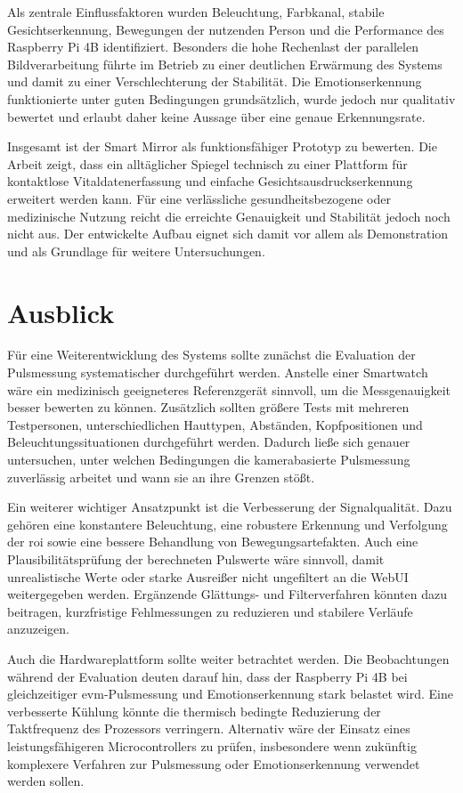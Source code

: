 Als zentrale Einflussfaktoren wurden Beleuchtung, Farbkanal, stabile Gesichtserkennung, Bewegungen der nutzenden Person und die Performance des Raspberry Pi 4B identifiziert. Besonders die hohe Rechenlast der parallelen Bildverarbeitung führte im Betrieb zu einer deutlichen Erwärmung des Systems und damit zu einer Verschlechterung der Stabilität. Die Emotionserkennung funktionierte unter guten Bedingungen grundsätzlich, wurde jedoch nur qualitativ bewertet und erlaubt daher keine Aussage über eine genaue Erkennungsrate.

Insgesamt ist der Smart Mirror als funktionsfähiger Prototyp zu bewerten. Die Arbeit zeigt, dass ein alltäglicher Spiegel technisch zu einer Plattform für kontaktlose Vitaldatenerfassung und einfache Gesichtsausdruckserkennung erweitert werden kann. Für eine verlässliche gesundheitsbezogene oder medizinische Nutzung reicht die erreichte Genauigkeit und Stabilität jedoch noch nicht aus. Der entwickelte Aufbau eignet sich damit vor allem als Demonstration und als Grundlage für weitere Untersuchungen.

\section{Ausblick}

Für eine Weiterentwicklung des Systems sollte zunächst die Evaluation der Pulsmessung systematischer durchgeführt werden. Anstelle einer Smartwatch wäre ein medizinisch geeigneteres Referenzgerät sinnvoll, um die Messgenauigkeit besser bewerten zu können. Zusätzlich sollten größere Tests mit mehreren Testpersonen, unterschiedlichen Hauttypen, Abständen, Kopfpositionen und Beleuchtungssituationen durchgeführt werden. Dadurch ließe sich genauer untersuchen, unter welchen Bedingungen die kamerabasierte Pulsmessung zuverlässig arbeitet und wann sie an ihre Grenzen stößt.

Ein weiterer wichtiger Ansatzpunkt ist die Verbesserung der Signalqualität. Dazu gehören eine konstantere Beleuchtung, eine robustere Erkennung und Verfolgung der \ac{roi} sowie eine bessere Behandlung von Bewegungsartefakten. Auch eine Plausibilitätsprüfung der berechneten Pulswerte wäre sinnvoll, damit unrealistische Werte oder starke Ausreißer nicht ungefiltert an die WebUI weitergegeben werden. Ergänzende Glättungs- und Filterverfahren könnten dazu beitragen, kurzfristige Fehlmessungen zu reduzieren und stabilere Verläufe anzuzeigen.

Auch die Hardwareplattform sollte weiter betrachtet werden. Die Beobachtungen während der Evaluation deuten darauf hin, dass der Raspberry Pi 4B bei gleichzeitiger \ac{evm}-Pulsmessung und Emotionserkennung stark belastet wird. Eine verbesserte Kühlung könnte die thermisch bedingte Reduzierung der Taktfrequenz des Prozessors verringern. Alternativ wäre der Einsatz eines leistungsfähigeren Microcontrollers zu prüfen, insbesondere wenn zukünftig komplexere Verfahren zur Pulsmessung oder Emotionserkennung verwendet werden sollen.

